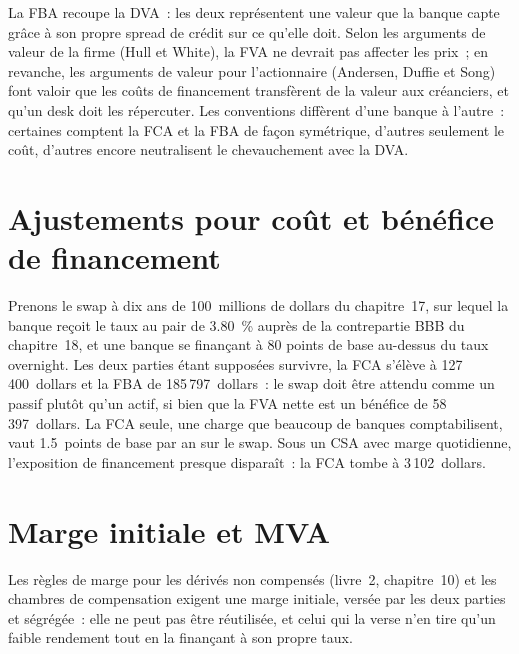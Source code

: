 La FBA recoupe la DVA~: les deux représentent une valeur que la banque capte grâce à son propre spread de crédit
sur ce qu'elle doit. Selon les arguments de valeur de la firme (Hull et White), la FVA ne devrait pas affecter les prix~;
en revanche, les arguments de valeur pour l'actionnaire (Andersen, Duffie et Song) font valoir que les coûts de financement transfèrent
de la valeur aux créanciers, et qu'un desk doit les répercuter. Les conventions diffèrent d'une banque à l'autre~: certaines comptent
la FCA et la FBA de façon symétrique, d'autres seulement le coût, d'autres encore neutralisent le chevauchement avec la DVA.

\section{Ajustements pour coût et bénéfice de financement}

\begin{example}\label{ex:rc:funding-margin-and-capital-adjustments:fva}
Prenons le swap à dix ans de 100~millions de dollars du chapitre~17, sur lequel la banque reçoit le taux
au pair de 3.80~\% auprès de la contrepartie BBB du chapitre~18, et une banque se finançant à 80 points de base
au-dessus du taux overnight. Les deux parties étant supposées survivre, la FCA s'élève à 127\,400~dollars et la
FBA de 185\,797~dollars~: le swap doit être attendu comme un passif plutôt qu'un actif, si bien que la FVA nette
est un bénéfice de 58\,397~dollars. La FCA seule, une charge que beaucoup de banques comptabilisent, vaut 1.5~points de base par
an sur le swap. Sous un CSA avec marge quotidienne, l'exposition de financement presque disparaît~: la
FCA tombe à 3\,102~dollars.
\end{example}

\label{lst:rc:funding-margin-and-capital-adjustments:fva}

\section{Marge initiale et MVA}

Les règles de marge pour les dérivés non compensés (livre~2, chapitre~10) et les chambres de compensation exigent
une marge initiale, versée par les deux parties et ségrégée~: elle ne peut pas être réutilisée, et celui qui la verse
n'en tire qu'un faible rendement tout en la finançant à son propre taux.

